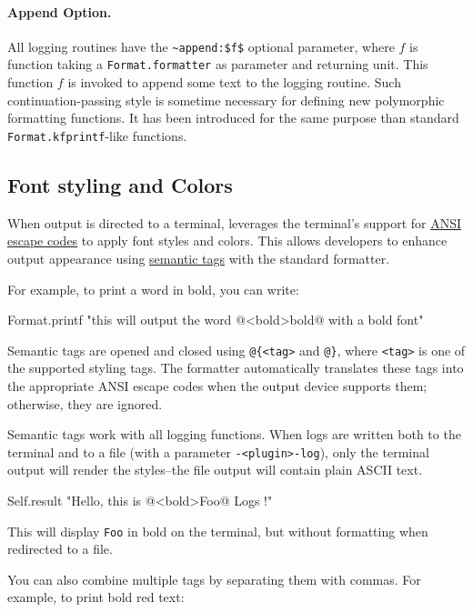 \paragraph{Append Option.} All logging routines have the
\lstinline{~append:$f$} optional parameter, where $f$ is function
taking a \lstinline{Format.formatter} as parameter and returning
unit. This function $f$ is invoked to append some text to the logging
routine. Such continuation-passing style is sometime necessary for
defining new polymorphic formatting functions. It has been introduced
for the same purpose than standard \lstinline{Format.kfprintf}-like
functions.

\subsection{Font styling and Colors}

When output is directed to a terminal, \framac leverages the terminal's support
for \href{https://en.wikipedia.org/wiki/ANSI_escape_code}{ANSI escape codes} to
apply font styles and colors. This allows developers to enhance output
appearance using
\href{https://ocaml.org/manual/5.4/api/Format.html#tags}{semantic tags} with the
standard formatter.

For example, to print a word in bold, you can write:

\begin{ocamlcode}
Format.printf "this will output the word @{<bold>bold@} with a bold font"
\end{ocamlcode}

Semantic tags are opened and closed using \texttt{@\{<tag>} and \texttt{@\}},
where \texttt{<tag>} is one of the supported styling tags. The formatter
automatically translates these tags into the appropriate ANSI escape codes when
the output device supports them; otherwise, they are ignored.

Semantic tags work with all logging functions. When logs are written both to the
terminal and to a file (with a parameter \texttt{-<plugin>-log}), only the
terminal output will render the styles--the file output will contain plain ASCII
text.

\begin{ocamlcode}
Self.result "Hello, this is @{<bold>Foo@} Logs !"
\end{ocamlcode}

This will display \texttt{Foo} in bold on the terminal, but without formatting
when redirected to a file.

You can also combine multiple tags by separating them with commas. For example,
to print bold red text:

